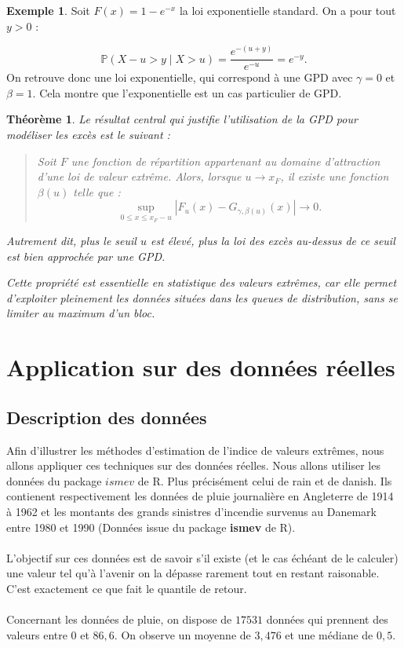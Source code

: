 \documentclass{article}
\theoremstyle{plain}
\theoremstyle{definition}
\newtheorem{example}[definition]{Exemple}
\theoremstyle{plain}
\newtheorem{theorem}[definition]{Théorème}
\begin{document}
\medskip
\begin{example}
Soit \(F(x) = 1 - e^{-x}\) la loi exponentielle standard. On a pour tout \(y > 0\) :

\[
\mathbb{P}(X - u > y \mid X > u) = \frac{e^{-(u + y)}}{e^{-u}} = e^{-y}.
\]
On retrouve donc une loi exponentielle, qui correspond à une GPD avec \(\gamma = 0\) et \(\beta = 1\). Cela montre que l’exponentielle est un cas particulier de GPD.
\end{example}

\begin{theorem}

Le résultat central qui justifie l’utilisation de la GPD pour modéliser les excès est le suivant :

\begin{quote}
Soit \(F\) une fonction de répartition appartenant au domaine d’attraction d’une loi de valeur extrême. Alors, lorsque \(u \to x_F\), il existe une fonction \(\beta(u)\) telle que :
\[
\sup_{0 \leq x \leq x_F - u} \left| F_u(x) - G_{\gamma, \beta(u)}(x) \right| \to 0.
\]
\end{quote}

Autrement dit, plus le seuil \(u\) est élevé, plus la loi des excès au-dessus de ce seuil est bien approchée par une GPD.

\medskip
Cette propriété est essentielle en statistique des valeurs extrêmes, car elle permet d’exploiter pleinement les données situées dans les queues de distribution, sans se limiter au maximum d’un bloc.
\end{theorem}
\newpage
\section{Application sur des données réelles}
\subsection{Description des données}

Afin d'illustrer les méthodes d'estimation de l'indice de valeurs extrêmes, nous allons appliquer ces techniques sur des données réelles.
Nous allons utiliser les données du package $ismev$ de R. Plus précisément celui de rain et de danish. Ils contienent respectivement les données de pluie journalière en Angleterre de 1914 à 1962 et 
les montants des grands sinistres d'incendie survenus au Danemark entre 1980 et 1990 (Données issue du package \textbf{ismev} de R).
\\
\\
L'objectif sur ces données est de savoir s'il existe (et le cas échéant de le calculer) une valeur tel qu'à l'avenir on la dépasse rarement tout en restant raisonable. C'est exactement ce que fait le quantile de retour.
\\
\\
Concernant les données de pluie, on dispose de $17531$ données qui prennent des valeurs entre $0$ et $86,6$. On observe un moyenne de $3,476$ et une médiane de $0,5$.
\end{document}
